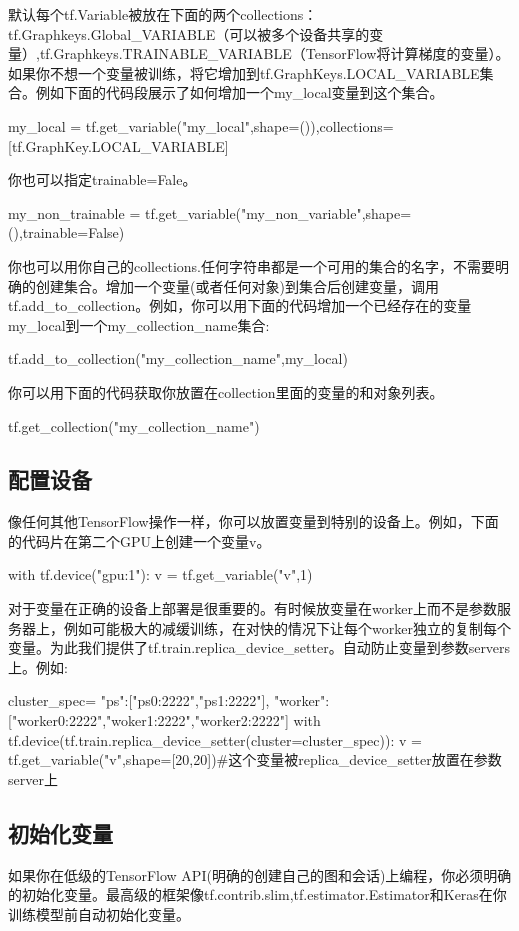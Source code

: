 默认每个tf.Variable被放在下面的两个collections：tf.Graphkeys.Global\_VARIABLE（可以被多个设备共享的变量）,tf.Graphkeys.TRAINABLE\_VARIABLE（TensorFlow将计算梯度的变量）。如果你不想一个变量被训练，将它增加到tf.GraphKeys.LOCAL\_VARIABLE集合。例如下面的代码段展示了如何增加一个my\_local变量到这个集合。
\begin{python}
my_local = tf.get_variable("my_local",shape=()),collections=[tf.GraphKey.LOCAL_VARIABLE]
\end{python}
你也可以指定trainable=Fale。
\begin{python}
my_non_trainable = tf.get_variable("my_non_variable",shape=(),trainable=False)
\end{python}
你也可以用你自己的collections.任何字符串都是一个可用的集合的名字，不需要明确的创建集合。增加一个变量(或者任何对象)到集合后创建变量，调用tf.add\_to\_collection。例如，你可以用下面的代码增加一个已经存在的变量my\_local到一个my\_collection\_name集合:
\begin{python}
	tf.add_to_collection("my_collection_name",my_local)
\end{python}
你可以用下面的代码获取你放置在collection里面的变量的和对象列表。
\begin{python}
tf.get_collection("my_collection_name")
\end{python}
\subsection{配置设备}
像任何其他TensorFlow操作一样，你可以放置变量到特别的设备上。例如，下面的代码片在第二个GPU上创建一个变量v。
\begin{python}
with tf.device("gpu:1"):
    v = tf.get_variable("v",1)
\end{python}
对于变量在正确的设备上部署是很重要的。有时候放变量在worker上而不是参数服务器上，例如可能极大的减缓训练，在对快的情况下让每个worker独立的复制每个变量。为此我们提供了tf.train.replica\_device\_setter。自动防止变量到参数servers上。例如:
\begin{python}
cluster_spec={
	"ps":["ps0:2222","ps1:2222"],
	"worker":["worker0:2222","woker1:2222","worker2:2222"]}
with tf.device(tf.train.replica_device_setter(cluster=cluster_spec)):
    v = tf.get_variable("v",shape=[20,20])#这个变量被replica_device_setter放置在参数server上
\end{python}
\subsection{初始化变量}
{\color{red}{在使用变量之前，你必须对变量进行初始化。}}如果你在低级的TensorFlow API(明确的创建自己的图和会话)上编程，你必须明确的初始化变量。最高级的框架像tf.contrib.slim,tf.estimator.Estimator和Keras在你训练模型前自动初始化变量。

